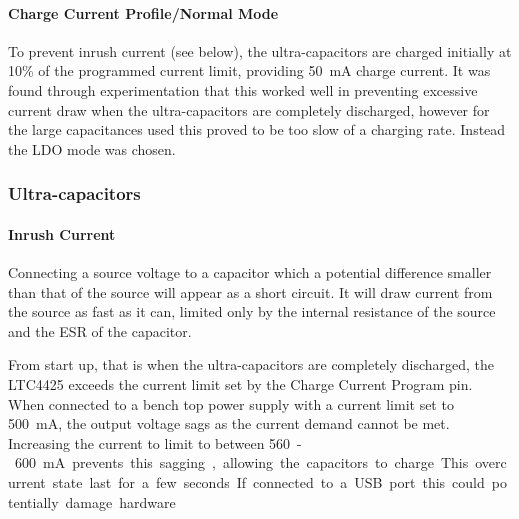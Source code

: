
\paragraph{Charge Current Profile/Normal Mode}
To prevent inrush current (see below), the ultra-capacitors are charged initially at 10\% of the programmed current limit, providing \SI{50}{mA} charge current. It was found through experimentation that this worked well in preventing excessive current draw when the ultra-capacitors are completely discharged, however for the large capacitances used this proved to be too slow of a charging rate. Instead the LDO mode was chosen.

\subsubsection{Ultra-capacitors}


\paragraph{Inrush Current}
Connecting a source voltage to a capacitor which a potential difference smaller than that of the source will appear as a short circuit. It will draw current from the source as fast as it can, limited only by the internal resistance of the source and the ESR of the capacitor.

From start up, that is when the ultra-capacitors are completely discharged, the LTC4425 exceeds the current limit set by the Charge Current Program pin. When connected to a bench top power supply with a current limit set to \SI{500}{mA}, the output voltage sags as the current demand cannot be met. Increasing the current to limit to between \SI{560}-\SI{600}{mA} prevents this sagging, allowing the capacitors to charge. This overcurrent state last for a few seconds. If connected to a USB port this could potentially damage hardware.
\\ \\
